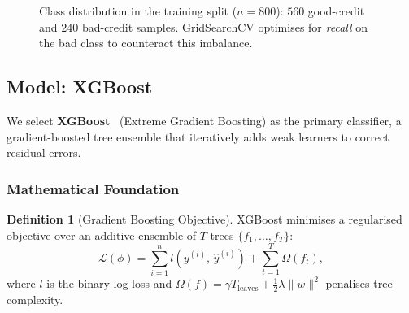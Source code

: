 \documentclass[12pt,a4paper]{article}
\theoremstyle{definition}
\newtheorem{definition}{Definition}[section]
\begin{document}
\begin{figure}[H]
\centering
{}
\caption{Class distribution in the training split ($n=800$): $560$ good-credit
  and $240$ bad-credit samples.  GridSearchCV optimises for \emph{recall} on
  the bad class to counteract this imbalance.}
\label{fig:smote}
\end{figure}

\subsection{Model: XGBoost}
\label{sec:rf}

We select \textbf{XGBoost}~\cite{chen2016} (Extreme Gradient Boosting) as the
primary classifier, a gradient-boosted tree ensemble that iteratively adds
weak learners to correct residual errors.

\subsubsection{Mathematical Foundation}

\begin{definition}[Gradient Boosting Objective]
  XGBoost minimises a regularised objective over an additive ensemble of $T$
  trees $\{f_1, \ldots, f_T\}$:
  \begin{equation}
    \mathcal{L}(\phi) = \sum_{i=1}^{n} l\!\left(y^{(i)},\, \hat{y}^{(i)}\right)
      + \sum_{t=1}^{T} \Omega(f_t),
    \label{eq:xgb-obj}
  \end{equation}
  where $l$ is the binary log-loss and
  $\Omega(f) = \gamma T_{\text{leaves}} + \tfrac{1}{2}\lambda\|w\|^2$
  penalises tree complexity.
\end{definition}
\end{document}
